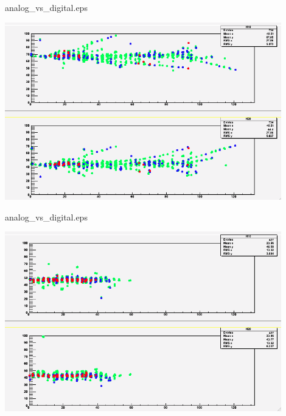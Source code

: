 \documentclass[10pt]{beamer}
\begin{document}
\begin{frame}{analog\_vs\_digital.eps}
    \centerline{\includegraphics[width=0.9\textwidth]{images/50GevPion}}
\end{frame}
\begin{frame}{analog\_vs\_digital.eps}
    \centerline{\includegraphics[width=0.9\textwidth]{images/50GevElectron}}
\end{frame}
\end{document}
